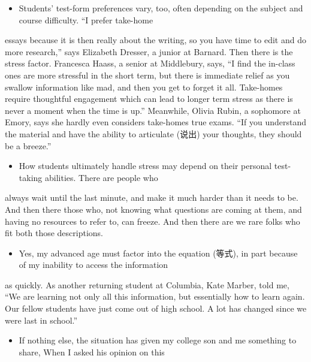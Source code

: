 \documentclass[UTF8,11pt]{ctexart}
\begin{document}
\begin{itemize}[leftmargin=2em,itemsep=.2em,topsep=.4em]\item[G.] Students’ test-form preferences vary, too, often depending on the subject and course difficulty. “I prefer take-home
\end{itemize}

essays because it is then really about the writing, so you have time to edit and do more research,” says Elizabeth Dresser, a junior at Barnard. Then there is the stress factor. Francesca Haass, a senior at Middlebury, says, “I find the in-class ones are more stressful in the short term, but there is immediate relief as you swallow information like mad, and then you get to forget it all. Take-homes require thoughtful engagement which can lead to longer term stress as there is never a moment when the time is up.” Meanwhile, Olivia Rubin, a sophomore at Emory, says she hardly even considers take-homes true exams. “If you understand the material and have the ability to articulate (说出) your thoughts, they should be a breeze.”


\begin{itemize}[leftmargin=2em,itemsep=.2em,topsep=.4em]\item[H.] How students ultimately handle stress may depend on their personal test-taking abilities. There are people who
\end{itemize}

always wait until the last minute, and make it much harder than it needs to be. And then there those who, not knowing what questions are coming at them, and having no resources to refer to, can freeze. And then there are we rare folks who fit both those descriptions.


\begin{itemize}[leftmargin=2em,itemsep=.2em,topsep=.4em]\item[I.] Yes, my advanced age must factor into the equation (等式), in part because of my inability to access the information
\end{itemize}

as quickly. As another returning student at Columbia, Kate Marber, told me, “We are learning not only all this information, but essentially how to learn again. Our fellow students have just come out of high school. A lot has changed since we were last in school.”


\begin{itemize}[leftmargin=2em,itemsep=.2em,topsep=.4em]\item[J.] If nothing else, the situation has given my college son and me something to share, When I asked his opinion on this
\end{itemize}
\end{document}
